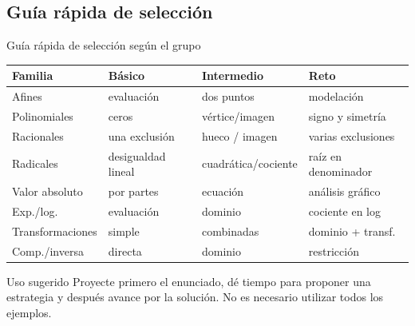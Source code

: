 \documentclass[aspectratio=169,10pt]{beamer}
\begin{document}
\subsection{Guía rápida de selección}
\begin{frame}{Guía rápida de selección según el grupo}
\small
\begin{tabular}{p{}p{}p{}p{}}
\toprule
\textbf{Familia} & \textbf{Básico} & \textbf{Intermedio} & \textbf{Reto}\\
\midrule
Afines & evaluación & dos puntos & modelación\\
Polinomiales & ceros & vértice/imagen & signo y simetría\\
Racionales & una exclusión & hueco / imagen & varias exclusiones\\
Radicales & desigualdad lineal & cuadrática/cociente & raíz en denominador\\
Valor absoluto & por partes & ecuación & análisis gráfico\\
Exp./log. & evaluación & dominio & cociente en log\\
Transformaciones & simple & combinadas & dominio + transf.\\
Comp./inversa & directa & dominio & restricción\\
\bottomrule
\end{tabular}
\vspace{1ex}
\begin{block}{Uso sugerido}
Proyecte primero el enunciado, dé tiempo para proponer una estrategia y después avance por la solución. No es necesario utilizar todos los ejemplos.
\end{block}
\end{frame}
\end{document}
